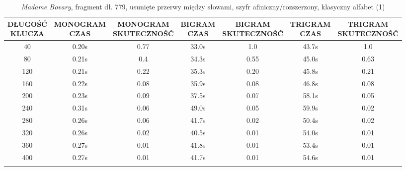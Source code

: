 \documentclass[a4paper]{article}
\theoremstyle{defn}
\theoremstyle{theorem}
\theoremstyle{lemma}
\theoremstyle{cor}
\theoremstyle{fact}
\begin{document}
\begin{center}\begin{small}\begin{longtable}{|c|c|c|c|c|c|c|} 
\hline \makecell{DŁUGOŚĆ\\KLUCZA} &  \makecell{MONOGRAM\\CZAS} & \makecell{MONOGRAM\\SKUTECZNOŚĆ} & \makecell{BIGRAM\\CZAS} &  \makecell{BIGRAM\\SKUTECZNOŚĆ} & \makecell{TRIGRAM\\CZAS} & \makecell{TRIGRAM\\SKUTECZNOŚĆ}\\ \hline 
40 & 0.20s & 0.77 & 33.0s & 1.0 & 43.7s & 1.0 \\ \hline 
80 & 0.21s & 0.4 & 34.3s & 0.55 & 45.0s & 0.63 \\ \hline 
120 & 0.21s & 0.22 & 35.3s & 0.20 & 45.8s & 0.21 \\ \hline 
160 & 0.22s & 0.08 & 35.9s & 0.08 & 46.8s & 0.08 \\ \hline 
200 & 0.23s & 0.09 & 37.5s & 0.07 & 58.1s & 0.05 \\ \hline 
240 & 0.31s & 0.06 & 49.0s & 0.05 & 59.9s & 0.02 \\ \hline 
280 & 0.26s & 0.06 & 41.7s & 0.02 & 50.4s & 0.02 \\ \hline 
320 & 0.26s & 0.02 & 40.5s & 0.01 & 54.0s & 0.01 \\ \hline 
360 & 0.27s & 0.01 & 41.8s & 0.01 & 53.4s & 0.01 \\ \hline 
400 & 0.27s & 0.01 & 41.7s & 0.01 & 54.6s & 0.01 \\ \hline 
\caption{\textit{Madame Bovary}, fragment dł. 779, usunięte przerwy między słowami, szyfr afiniczny/rozszerzony, klasyczny alfabet (1)}
\end{longtable}\end{small}\end{center} 
\end{document}
